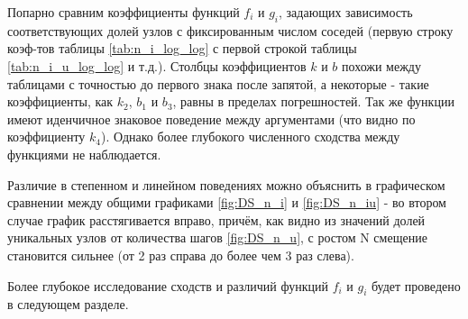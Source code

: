 Попарно сравним коэффициенты функций $f_i$ и $g_i$, задающих зависимость соответствующих долей узлов с фиксированным числом соседей (первую строку коэф-тов таблицы \ref{tab:n_i_log_log} с первой строкой таблицы \ref{tab:n_i_u_log_log} и т.д.).
Столбцы коэффициентов $k$ и $b$ похожи между таблицами с точностью до первого знака после запятой, а некоторые - такие коэффициенты, как $k_2$, $b_1$ и $b_3$, равны в пределах погрешностей. 
Так же функции имеют иденчичное знаковое поведение между аргументами (что видно по коэффициенту $k_4$).
Однако более глубокого численного сходства между функциями не наблюдается.

Различие в степенном и линейном поведениях можно объяснить в графическом сравнении между общими графиками \ref{fig:DS_n_i} и \ref{fig:DS_n_iu} - во втором случае график расстягивается вправо, причём, как видно из значений долей уникальных узлов от количества шагов \ref{fig:DS_n_u}, с ростом N смещение становится сильнее (от 2 раз справа до более чем 3 раз слева).

Более глубокое исследование сходств и различий функций $f_i$ и $g_i$ будет проведено в следующем разделе.


\newpage 